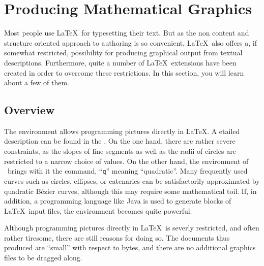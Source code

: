 \setcounter{chapter}{4}
\newcommand{\graphicscompanion}{\emph{The \LaTeX{} Graphics Companion}~\cite{graphicscompanion}} 
\newcommand{\hobby}{\emph{A User's Manual for MetaPost}~\cite{metapost}}
\newcommand{\hoenig}{\emph{\TeX{} Unbound}~\cite{unbound}}
\newcommand{\graphicsinlatex}{\emph{Graphics in \LaTeXe{}}~\cite{ursoswald}}

\chapter{Producing Mathematical Graphics}

\begin{intro}
Most people use \LaTeX\ for typesetting their text. But as the non content and
structure oriented approach to authoring is so convenient, \LaTeX\ also offers a,
if somewhat restricted, possibility for producing graphical output from textual 
descriptions. Furthermore, quite a number of \LaTeX\ extensions have been created 
in order to overcome these restrictions. In this section, you will learn about a 
few of them.
\end{intro}

\section{Overview}

The  environment allows programming pictures directly in \LaTeX. 
A etailed description can be found in the \manual.
On the one hand, there are rather severe constraints, as the slopes of line segments 
as well as the radii of circles are restricted to a narrow choice of values. 
On the other hand, the  environment of \LaTeXe\ 
brings with it the  command, ``\texttt{q}'' meaning ``quadratic''. 
Many frequently used curves such as circles, ellipses, or catenaries can be 
satisfactorily approximated by quadratic B\'ezier curves, although this may 
require some mathematical toil. If, in addition, a programming language like Java 
is used to generate \ci{qbezier} blocks of \LaTeX\ input files, the \ei{picture} 
environment becomes quite powerful. 

Although programming pictures directly in \LaTeX\ is severly restricted,
and often rather tiresome, there are still reasons for doing so. The documents
thus produced are ``small'' with respect to bytes, and there are no additional
graphics files to be dragged along.

